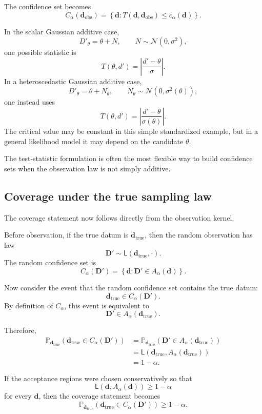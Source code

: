 \documentclass[11pt]{article}
\newcommand{\Dobsrand}{\mathbf D'}
\newcommand{\dtrue}{\mathbf d_{\mathrm{true}}}
\newcommand{\dobs}{\mathbf d_{\mathrm{obs}}}
\newcommand{\Calpha}{C_{\alpha}}
\newcommand{\Prob}{\mathbb P}
\begin{document}
The confidence set becomes
\[
    \Calpha(\dobs)
    =
    \left\{
        \mathbf d:
        T(\mathbf d,\dobs)\leq c_{\alpha}(\mathbf d)
    \right\}.
\]

In the scalar Gaussian additive case,
\[
    D'_{\theta}=\theta+N,
    \qquad
    N\sim\mathcal N(0,\sigma^2),
\]
one possible statistic is
\[
    T(\theta,d')
    =
    \left|
        \frac{d'-\theta}{\sigma}
    \right|.
\]
In a heteroscedastic Gaussian additive case,
\[
    D'_{\theta}=\theta+N_{\theta},
    \qquad
    N_{\theta}\sim\mathcal N(0,\sigma^2(\theta)),
\]
one instead uses
\[
    T(\theta,d')
    =
    \left|
        \frac{d'-\theta}{\sigma(\theta)}
    \right|.
\]
The critical value may be constant in this simple standardized example, but in a general likelihood model it may depend on the candidate \(\theta\).

The test-statistic formulation is often the most flexible way to build confidence sets when the observation law is not simply additive.

\subsection{Coverage under the true sampling law}

The coverage statement now follows directly from the observation kernel.

Before observation, if the true datum is \(\dtrue\), then the random observation has law
\[
    \Dobsrand\sim\mathsf L(\dtrue,\cdot).
\]
The random confidence set is
\[
    \Calpha(\Dobsrand)
    =
    \left\{
        \mathbf d:
        \Dobsrand\in A_{\alpha}(\mathbf d)
    \right\}.
\]

Now consider the event that the random confidence set contains the true datum:
\[
    \dtrue\in\Calpha(\Dobsrand).
\]
By definition of \(\Calpha\), this event is equivalent to
\[
    \Dobsrand\in A_{\alpha}(\dtrue).
\]

Therefore,
\[
\begin{aligned}
    \Prob_{\dtrue}
    \left(
        \dtrue\in\Calpha(\Dobsrand)
    \right)
    &=
    \Prob_{\dtrue}
    \left(
        \Dobsrand\in A_{\alpha}(\dtrue)
    \right)
    \\
    &=
    \mathsf L
    \left(
        \dtrue,
        A_{\alpha}(\dtrue)
    \right)
    \\
    &=
    1-\alpha.
\end{aligned}
\]

If the acceptance regions were chosen conservatively so that
\[
    \mathsf L
    \left(
        \mathbf d,
        A_{\alpha}(\mathbf d)
    \right)
    \geq
    1-\alpha
\]
for every \(\mathbf d\), then the coverage statement becomes
\[
    \Prob_{\dtrue}
    \left(
        \dtrue\in\Calpha(\Dobsrand)
    \right)
    \geq
    1-\alpha.
\]
\end{document}
